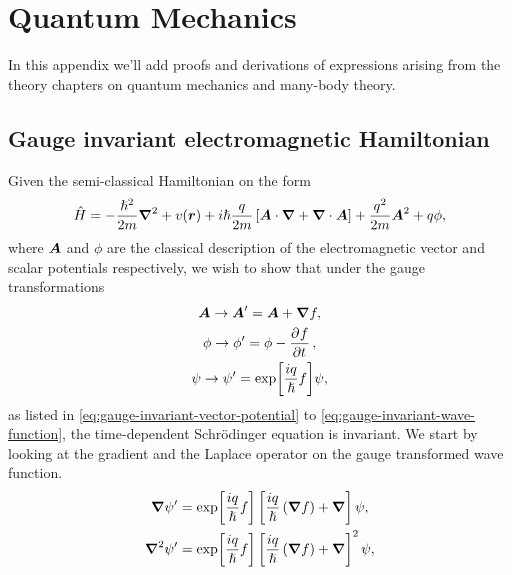 \chapter{Quantum Mechanics}
    In this appendix we'll add proofs and derivations of expressions arising
    from the theory chapters on quantum mechanics and many-body theory.

    \section{Gauge invariant electromagnetic Hamiltonian}
        \label{app:gauge-invariant-electromagnetic-hamiltonian}
        Given the semi-classical Hamiltonian on the form
        \begin{align}
            \hat{H}
            = -\frac{\hslash^2}{2m}\boldsymbol{\nabla}^2
            + v(\boldsymbol{r})
            + i\hslash\frac{q}{2m}\left[ 
                \boldsymbol{A}\cdot\boldsymbol{\nabla}
                + \boldsymbol{\nabla}\cdot\boldsymbol{A}
             \right]
            + \frac{q^2}{2m}\boldsymbol{A}^2
            + q\phi,
        \end{align}
        where $\boldsymbol{A}$ and $\phi$ are the classical description of the
        electromagnetic vector and scalar potentials respectively, we wish to
        show that under the gauge transformations
        \begin{gather}
            \vfg{A} \to \vfg{A}' = \vfg{A} + \vfg{\nabla}f,
            \\
            \phi \to \phi' = \phi - \dpd{f}{t},
            \\
            \psi \to \psi' = \exp[\frac{iq}{\hslash}f]\psi,
        \end{gather}
        as listed in \autoref{eq:gauge-invariant-vector-potential} to
        \autoref{eq:gauge-invariant-wave-function}, the time-dependent
        Schrödinger equation is invariant.
        We start by looking at the gradient and the Laplace operator on the
        gauge transformed wave function.
        \begin{gather}
            \boldsymbol{\nabla}\psi'
            = \exp[\frac{iq}{\hslash} f]\left[ 
                \frac{iq}{\hslash}\left( \boldsymbol{\nabla}f \right)
                + \boldsymbol{\nabla}
             \right]\psi, \\
            \boldsymbol{\nabla}^2\psi'
            = \exp[\frac{iq}{\hslash} f]\left[ 
                \frac{iq}{\hslash}\left( \boldsymbol{\nabla}f \right)
                + \boldsymbol{\nabla}
             \right]^2\psi, \\
        \end{gather}
